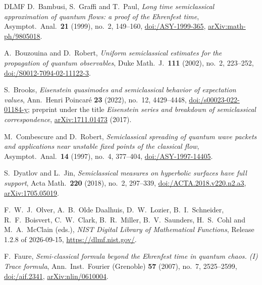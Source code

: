 \documentclass[twoside,10pt]{article}
\numberwithin{equation}{section}
\theoremstyle{slbody}
\theoremstyle{remark}
\begin{document}
\begin{thebibliography}{DLMF}
D.~Bambusi, S.~Graffi and T.~Paul,
\emph{Long time semiclassical approximation of quantum flows: a proof of the
Ehrenfest time},
Asymptot.\ Anal.\ \textbf{21} (1999), no.~2, 149--160,
\href{https://doi.org/10.3233/ASY-1999-365}{doi:/ASY-1999-365},
\href{https://arxiv.org/abs/math-ph/9805018}{arXiv:math-ph/9805018}.

A.~Bouzouina and D.~Robert,
\emph{Uniform semiclassical estimates for the propagation of quantum
observables},
Duke Math.\ J.\ \textbf{111} (2002), no.~2, 223--252,
\href{https://doi.org/10.1215/S0012-7094-02-11122-3}{doi:/S0012-7094-02-11122-3}.

S.~Brooks,
\emph{Eisenstein quasimodes and semiclassical behavior of expectation values},
Ann.\ Henri Poincar\'e \textbf{23} (2022), no.~12, 4429--4448,
\href{https://doi.org/10.1007/s00023-022-01184-y}{doi:/s00023-022-01184-y};
preprint under the title \emph{Eisenstein series and breakdown of semiclassical correspondence},
\href{https://arxiv.org/abs/1711.01473}{arXiv:1711.01473} (2017).

M.~Combescure and D.~Robert,
\emph{Semiclassical spreading of quantum wave packets and applications near
unstable fixed points of the classical flow},
Asymptot.\ Anal.\ \textbf{14} (1997), no.~4, 377--404,
\href{https://doi.org/10.3233/ASY-1997-14405}{doi:/ASY-1997-14405}.

S.~Dyatlov and L.~Jin,
\emph{Semiclassical measures on hyperbolic surfaces have full support},
Acta Math.\ \textbf{220} (2018), no.~2, 297--339,
\href{https://doi.org/10.4310/ACTA.2018.v220.n2.a3}{doi:/ACTA.2018.v220.n2.a3},
\href{https://arxiv.org/abs/1705.05019}{arXiv:1705.05019}.

F.~W.~J.~Olver, A.~B.~Olde Daalhuis, D.~W.~Lozier, B.~I.~Schneider, R.~F.~Boisvert, C.~W.~Clark, B.~R.~Miller,
B.~V.~Saunders, H.~S.~Cohl and M.~A.~McClain (eds.),
\emph{NIST Digital Library of Mathematical Functions}, Release 1.2.8 of 2026-09-15,
\href{https://dlmf.nist.gov/}{https://dlmf.nist.gov/}.

F.~Faure,
\emph{Semi-classical formula beyond the Ehrenfest time in quantum chaos. (I) Trace formula},
Ann.\ Inst.\ Fourier (Grenoble) \textbf{57} (2007), no.~7, 2525--2599,
\href{https://doi.org/10.5802/aif.2341}{doi:/aif.2341},
\href{https://arxiv.org/abs/nlin/0610004}{arXiv:nlin/0610004}.


\end{thebibliography}
\end{document}
